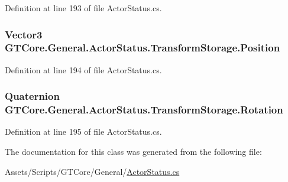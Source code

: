Definition at line 193 of file Actor\+Status.\+cs.

\hypertarget{class_g_t_core_1_1_general_1_1_actor_status_1_1_transform_storage_a50f0fde9da25ebe17969c0bcc374c5f4}{}
\subsubsection[{Position}]{\setlength{\rightskip}{0pt plus 5cm}Vector3 G\+T\+Core.\+General.\+Actor\+Status.\+Transform\+Storage.\+Position}\label{class_g_t_core_1_1_general_1_1_actor_status_1_1_transform_storage_a50f0fde9da25ebe17969c0bcc374c5f4}


Definition at line 194 of file Actor\+Status.\+cs.

\hypertarget{class_g_t_core_1_1_general_1_1_actor_status_1_1_transform_storage_a6ad17f8ccac52b615f4124d8e3c7b09a}{}
\subsubsection[{Rotation}]{\setlength{\rightskip}{0pt plus 5cm}Quaternion G\+T\+Core.\+General.\+Actor\+Status.\+Transform\+Storage.\+Rotation}\label{class_g_t_core_1_1_general_1_1_actor_status_1_1_transform_storage_a6ad17f8ccac52b615f4124d8e3c7b09a}


Definition at line 195 of file Actor\+Status.\+cs.



The documentation for this class was generated from the following file\+:\begin{DoxyCompactItemize}
\item 
Assets/\+Scripts/\+G\+T\+Core/\+General/\hyperlink{_actor_status_8cs}{Actor\+Status.\+cs}\end{DoxyCompactItemize}

